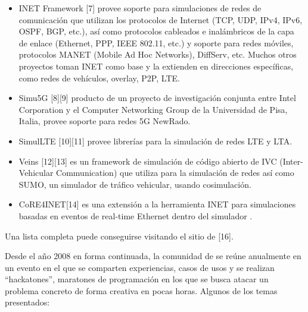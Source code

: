 \begin{itemize}
    \item INET Framework [7] provee soporte para simulaciones de redes de
comunicación que utilizan los protocolos de Internet (TCP, UDP, IPv4, IPv6,
OSPF, BGP, etc.), así como protocolos cableados e inalámbricos de la capa de
enlace (Ethernet, PPP, IEEE 802.11, etc.) y soporte para redes móviles,
protocolos MANET (Mobile Ad Hoc Networks), DiffServ, etc. Muchos otros
proyectos toman INET como base y la extienden en direcciones específicas, como
redes de vehículos, overlay, P2P, LTE.

    \item Simu5G [8][9] producto de un proyecto de investigación conjunta entre
Intel Corporation y el Computer Networking Group de la Universidad de Pisa,
Italia, provee soporte para redes 5G NewRado.

    \item SimulLTE [10][11] provee librerías para la simulación de redes LTE y
LTA.

    \item Veins [12][13] es un framework de simulación de código abierto de IVC
(Inter-Vehicular Communication) que utiliza \omnetpp{} para la simulación de
redes así como SUMO, un simulador de tráfico vehicular, usando cosimulación.

    \item CoRE4INET[14] es una extensión a la herramienta INET para
simulaciones basadas en eventos de real-time Ethernet dentro del simulador
\omnetpp{}.

\end{itemize}

Una lista completa puede conseguirse visitando el sitio de \omnetpp{} [16].

Desde el año 2008 en forma continuada, la comunidad de \omnetpp{} se reúne
anualmente en un evento en el que se comparten experiencias, casos de usos y se
realizan ``hackatones'', maratones de programación en los que se busca atacar
un problema concreto de forma creativa en pocas horas. Algunos de los temas
presentados:

